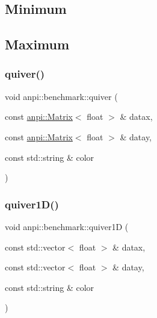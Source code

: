 \subsection*{Minimum}

\subsection*{Maximum}\mbox{\label{namespaceanpi_1_1benchmark_a7780fd16b79ca29deebddc3494da1886}} 
\subsubsection{\texorpdfstring{quiver()}{quiver()}}
{\footnotesize\ttfamily void anpi\+::benchmark\+::quiver (\begin{DoxyParamCaption}\item[{const \hyperlink{classanpi_1_1Matrix}{anpi\+::\+Matrix}$<$ float $>$ \&}]{datax,  }\item[{const \hyperlink{classanpi_1_1Matrix}{anpi\+::\+Matrix}$<$ float $>$ \&}]{datay,  }\item[{const std\+::string \&}]{color }\end{DoxyParamCaption})}

\mbox{\label{namespaceanpi_1_1benchmark_a5595edd07bd29c91ca3b040e2601efb7}} 
\subsubsection{\texorpdfstring{quiver1\+D()}{quiver1D()}}
{\footnotesize\ttfamily void anpi\+::benchmark\+::quiver1D (\begin{DoxyParamCaption}\item[{const std\+::vector$<$ float $>$ \&}]{datax,  }\item[{const std\+::vector$<$ float $>$ \&}]{datay,  }\item[{const std\+::string \&}]{color }\end{DoxyParamCaption})}

\mbox{\label{namespaceanpi_1_1benchmark_ad790ffd5a54be367b4ffa1fd862f9ba2}} 
